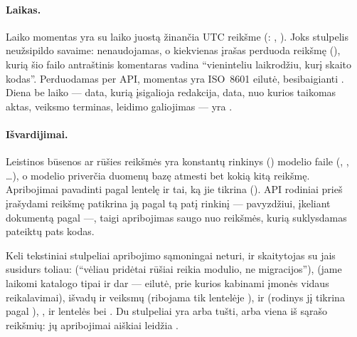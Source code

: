 \paragraph{Laikas.} Laiko momentas yra  su laiko juostą žinančia UTC
reikšme (: , ). Joks stulpelis
neužsipildo savaime:  nenaudojamas, o kiekvienas įrašas perduoda
 reikšmę (), kurią šio failo antraštinis komentaras
vadina \enquote{vieninteliu laikrodžiu, kurį skaito kodas}. Perduodamas per API, momentas yra
ISO~8601 eilutė, besibaigianti . Diena be laiko --- data, kurią įsigalioja
redakcija, data, nuo kurios taikomas aktas, veiksmo terminas, leidimo galiojimas --- yra
.

\paragraph{Išvardijimai.} Leistinos būsenos ar rūšies reikšmės yra konstantų rinkinys
() modelio faile (, , \dots), o
 modelio  priverčia duomenų bazę atmesti bet kokią
kitą reikšmę. Apribojimai pavadinti pagal lentelę ir tai, ką jie tikrina (). API rodiniai prieš įrašydami reikšmę
patikrina ją pagal tą patį rinkinį --- pavyzdžiui, įkeliant dokumentą pagal
 ---, taigi apribojimas saugo nuo reikšmės, kurią suklysdamas pateiktų pats
kodas.


Keli tekstiniai stulpeliai apribojimo sąmoningai neturi, ir skaitytojas su jais susidurs
toliau:  (\enquote{vėliau pridėtai rūšiai reikia modulio, ne
migracijos}),  (jame laikomi katalogo tipai ir dar
 --- eilutė, prie kurios kabinami įmonės vidaus reikalavimai), išvadų ir
veiksmų  (ribojama tik lentelėje ),
 ir  (rodinys jį
tikrina pagal ), ,
 ir lentelės   bei . Du
 stulpeliai yra arba tušti, arba viena iš sąrašo reikšmių: jų
apribojimai aiškiai leidžia .

